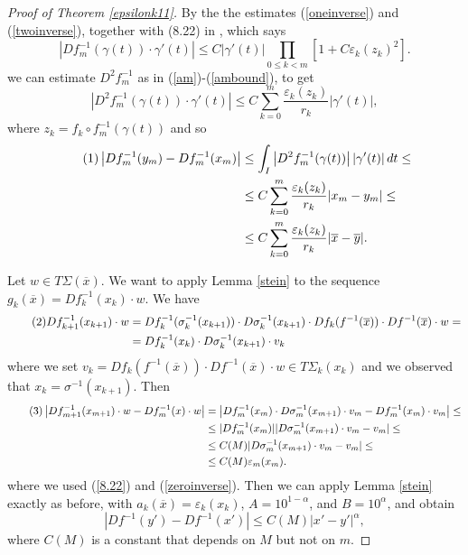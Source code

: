 \documentclass[11pt, twoside, leqno]{article}
\numberwithin{equation}{section}
\newcommand\numberthis{\addtocounter{equation}{1}\tag{\theequation}}
\theoremstyle{plain}
\theoremstyle{definition}
\newcommand{\e}{\varepsilon} %
\begin{document}
\begin{proof}[Proof of Theorem \ref{epsilonk11}]
By the the estimates (\ref{oneinverse}) and (\ref{twoinverse}), together with (8.22) in \cite{davidtoro}, which says
\begin{equation} \label{8.22}
|Df_m^{-1}(\gamma(t)) \cdot \gamma'(t)| \leq C |\gamma'(t)| \prod_{0 \leq k < m} [1+C \e_k(z_k)^2].
\end{equation}
we can estimate $D^2f_{m}^{-1}$ as in (\ref{am})-(\ref{ambound}), to get
\begin{equation} 
\left|D^2f_m^{-1} ( \gamma (t))\cdot \gamma'(t)\right| \leq C \sum_{k=0}^m \frac{\e_k(z_k)}{r_k} |\gamma'(t)|,
\end{equation}
where $z_k=f_k \circ f_m^{-1}(\gamma(t))$ and so
\begin{align*} \numberthis \label{inverse_bound}
\left|Df_m^{-1}(y_m)-Df_m^{-1}(x_m)\right|   & \leq \int_I \left|D^2f_m^{-1} ( \gamma (t))\right||\gamma'(t)|\,dt \leq \\
& \leq C\sum_{k=0}^m  \frac{\e_k(z_k)}{r_k}|x_m-y_m| \leq \\
& \leq C\sum_{k=0}^m  \frac{\e_k(z_k)}{r_k}|\overline{x}-\overline{y}|.
\end{align*}

Let $w \in T\Sigma(\overline{x})$. We want to apply Lemma \ref{stein} to the sequence $g_k(\overline{x})=Df_k^{-1}(x_k)\cdot w$. We have
\begin{align*} \numberthis
Df_{k+1}^{-1}(x_{k+1})\cdot w& =Df_k^{-1}(\sigma_k^{-1}(x_{k+1})) \cdot D\sigma_k^{-1}(x_{k+1})\cdot Df_k(f^{-1}(\overline{x})) \cdot Df^{-1}(\overline{x}) \cdot w = \\
& = Df_k^{-1}(x_k) \cdot D\sigma_k^{-1}(x_{k+1})\cdot v_k
\end{align*}
where we set $v_k =Df_k(f^{-1}(\overline{x})) \cdot Df^{-1}(\overline{x}) \cdot w \in T\Sigma_k(x_k)$ and we observed that $x_k=\sigma^{-1}(x_{k+1})$. Then 
\begin{align*} \numberthis
\left|Df_{m+1}^{-1}(x_{m+1})\cdot w -Df_m^{-1}(x)\cdot w\right|& = \left|  Df_m^{-1}(x_m) \cdot D\sigma_m^{-1}(x_{m+1})\cdot v_m - Df_m^{-1}(x_m)\cdot v_m\right| \leq \\
& \leq |Df_m^{-1}(x_m)| |D\sigma_m^{-1}(x_{m+1})\cdot v_m -v_m| \leq \\
& \leq C(M) |D\sigma_m^{-1}(x_{m+1})\cdot v_m -v_m| \leq \\
& \leq C(M) \e_m(x_m).
\end{align*}
where we used (\ref{8.22}) and (\ref{zeroinverse}).
Then we can apply Lemma \ref{stein} exactly as before, with $a_k(\overline{x})=  \e_k(x_k)$, $A=10^{1-\alpha}$, and $B=10^{\alpha}$, and obtain
\begin{equation}
\left|Df^{-1}(y')-Df^{-1}(x') \right|\leq C(M)|x'-y'|^{\alpha},
\end{equation}
 where $C(M)$ is a constant that depends on $M$ but not on $m$.
\end{proof}
\end{document}
